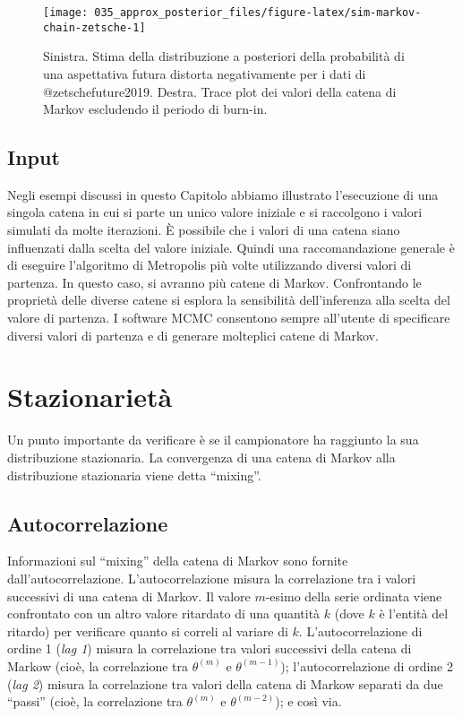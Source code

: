 \documentclass[
]{memoir}
\begin{document}
\begin{figure}

{\centering \texttt{[image: 035\_approx\_posterior\_files/figure-latex/sim-markov-chain-zetsche-1]} 

}

\caption{Sinistra. Stima della distribuzione a posteriori della probabilità di una aspettativa futura distorta negativamente per i dati di @zetschefuture2019. Destra. Trace plot dei valori della catena di Markov escludendo il periodo di burn-in.}\label{fig:sim-markov-chain-zetsche}
\end{figure}

\hypertarget{input}{%
\subsection{Input}\label{input}}

Negli esempi discussi in questo Capitolo abbiamo illustrato l'esecuzione di una singola catena in cui si parte un unico valore iniziale e si raccolgono i valori simulati da molte iterazioni. È possibile che i valori di una catena siano influenzati dalla scelta del valore iniziale. Quindi una raccomandazione generale è di eseguire l'algoritmo di Metropolis più volte utilizzando diversi valori di partenza. In questo caso, si avranno più catene di Markov. Confrontando le proprietà delle diverse catene si esplora la sensibilità dell'inferenza alla scelta del valore di partenza. I software MCMC consentono sempre all'utente di specificare diversi valori di partenza e di generare molteplici catene di Markov.

\hypertarget{stazionarietuxe0}{%
\section{Stazionarietà}\label{stazionarietuxe0}}

Un punto importante da verificare è se il campionatore ha raggiunto la sua distribuzione stazionaria. La convergenza di una catena di Markov alla distribuzione stazionaria viene detta ``mixing''.

\hypertarget{approx-post-autocor}{%
\subsection{Autocorrelazione}\label{approx-post-autocor}}

Informazioni sul ``mixing'' della catena di Markov sono fornite dall'autocorrelazione. L'autocorrelazione misura la correlazione tra i valori successivi di una catena di Markov. Il valore \(m\)-esimo della serie ordinata viene confrontato con un altro valore ritardato di una quantità \(k\) (dove \(k\) è l'entità del ritardo) per verificare quanto si correli al variare di \(k\). L'autocorrelazione di ordine 1 (\emph{lag 1}) misura la correlazione tra valori successivi della catena di Markow (cioè, la correlazione tra \(\theta^{(m)}\) e \(\theta^{(m-1)}\)); l'autocorrelazione di ordine 2 (\emph{lag 2}) misura la correlazione tra valori della catena di Markow separati da due ``passi'' (cioè, la correlazione tra \(\theta^{(m)}\) e \(\theta^{(m-2)}\)); e così via.
\end{document}
